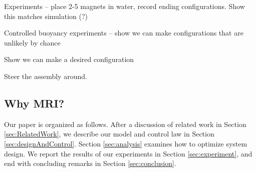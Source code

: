  Experiments -- place 2-5 magnets in water,  record ending configurations.  Show this matches simulation (?)
 
 Controlled buoyancy experiments -- show we can make configurations that are unlikely by chance
 
 Show we can make a desired configuration
 
 Steer the assembly around.
 
 
 \subsection{Why MRI?}

 

 Our paper is organized as follows.  After a discussion of related work in Section \ref{sec:RelatedWork}, we describe our model and control law in Section \ref{sec:designAndControl}.  Section \ref{sec:analysis} examines how to optimize system design.   We report the results of our experiments in Section \ref{sec:experiment}, and end with concluding remarks in Section \ref{sec:conclusion}.


